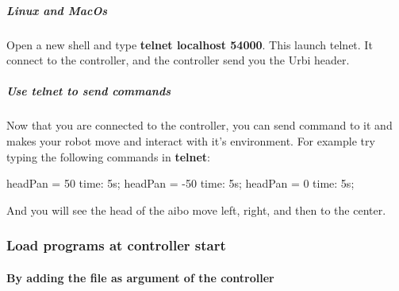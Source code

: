 \subparagraph{Linux and MacOs}
\label{webots.firstrun.clientsoftware.telnet.linuxandmacos}%

Open a new shell and type \textbf{telnet localhost 54000}.  This
launch telnet. It connect to the \urbi controller, and the \urbi
controller send you the Urbi header.




\subparagraph{Use telnet to send commands}
\label{webots.firstrun.clientsoftware.telnet.usetelnet}%

Now that you are connected to the \urbi controller, you can send
command to it and makes your robot move and interact with it's
environment. For example try typing the following commands in
\textbf{telnet}:

\begin{urbifixme}
headPan = 50 time: 5s;
headPan = -50 time: 5s;
headPan = 0 time: 5s;
\end{urbifixme}
And you will see the head of the aibo move left, right, and then to
the center.




\subsubsection{Load \urbi programs at controller start}
\label{webots.firstrun.loadprograms}%

\paragraph{By adding the file as argument of the \urbi controller}
\label{webots.firstrun.loadprograms.cmd_line}%

